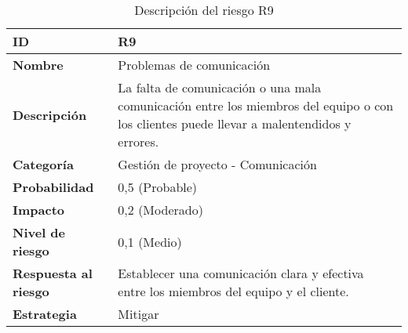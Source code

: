 \begin{table}[H]
	\centering
	\begin{tabular}{|l|m{12cm}|}
		\hline
		\textbf{ID}                  & R9                                                                                                                                        \\
		\hline
		\textbf{Nombre}              & Problemas de comunicación                                                                                                                 \\
		\hline
		\textbf{Descripción}         & La falta de comunicación o una mala comunicación entre los miembros del equipo o con los clientes puede llevar a malentendidos y errores. \\
		\hline
		\textbf{Categoría}           & Gestión de proyecto - Comunicación                                                                                                        \\
		\hline
		\textbf{Probabilidad}        & 0,5 (Probable)                                                                                                                            \\
		\hline
		\textbf{Impacto}             & 0,2 (Moderado)                                                                                                                            \\
		\hline
		\textbf{Nivel de riesgo}     & 0,1 (Medio)                                                                                                                               \\
		\hline
		\textbf{Respuesta al riesgo} & Establecer una comunicación clara y efectiva entre los miembros del equipo y el cliente.                                                  \\
		\hline
		\textbf{Estrategia}          & Mitigar                                                                                                                                   \\
		\hline
	\end{tabular}
	\caption{Descripción del riesgo R9}
\end{table}

\vspace{0.5cm}

